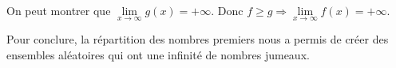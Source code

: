 \documentclass[../main.tex]{subfiles}
\begin{document}
On peut montrer que $\lim\limits_{x \rightarrow \infty} g(x) = + \infty$. Donc $f \geqslant g \Rightarrow \lim\limits_{x \rightarrow \infty} f(x) = + \infty$.

Pour conclure, la répartition des nombres premiers nous a permis de créer des ensembles aléatoires qui ont une infinité de nombres jumeaux. 

\clearpage
\end{document}
